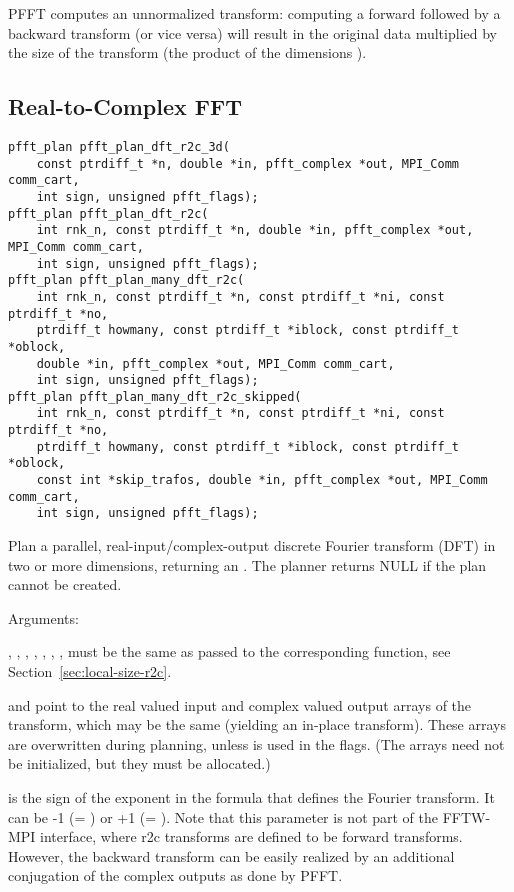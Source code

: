 PFFT computes an unnormalized transform: computing a forward followed by a backward transform (or vice versa) will result
in the original data multiplied by the size of the transform (the product of the dimensions ).

\subsection{Real-to-Complex FFT}
\begin{lstlisting}
pfft_plan pfft_plan_dft_r2c_3d(
    const ptrdiff_t *n, double *in, pfft_complex *out, MPI_Comm comm_cart,
    int sign, unsigned pfft_flags);
pfft_plan pfft_plan_dft_r2c(
    int rnk_n, const ptrdiff_t *n, double *in, pfft_complex *out, MPI_Comm comm_cart,
    int sign, unsigned pfft_flags);
pfft_plan pfft_plan_many_dft_r2c(
    int rnk_n, const ptrdiff_t *n, const ptrdiff_t *ni, const ptrdiff_t *no,
    ptrdiff_t howmany, const ptrdiff_t *iblock, const ptrdiff_t *oblock,
    double *in, pfft_complex *out, MPI_Comm comm_cart,
    int sign, unsigned pfft_flags);
pfft_plan pfft_plan_many_dft_r2c_skipped(
    int rnk_n, const ptrdiff_t *n, const ptrdiff_t *ni, const ptrdiff_t *no,
    ptrdiff_t howmany, const ptrdiff_t *iblock, const ptrdiff_t *oblock,
    const int *skip_trafos, double *in, pfft_complex *out, MPI_Comm comm_cart,
    int sign, unsigned pfft_flags);
\end{lstlisting}
Plan a parallel, real-input/complex-output discrete Fourier transform (DFT) in two or more dimensions, returning an .
The planner returns NULL if the plan cannot be created.

Arguments:
\begin{compactitem}
  \item {}, , , , , , ,  must be the same as passed
        to the corresponding  function, see Section~\ref{sec:local-size-r2c}.
  \item {} and  point to the real valued input and complex valued output arrays of the transform, which may be the same (yielding an in-place transform).
        These arrays are overwritten during planning, unless  is used in the flags.
        (The arrays need not be initialized, but they must be allocated.)
  \item {} is the sign of the exponent in the formula that defines the Fourier transform. It can be -1 (= ) or +1 (= ).
        Note that this parameter is not part of the FFTW-MPI interface, where r2c transforms are defined to be forward transforms.
        However, the backward transform can be easily realized by an additional conjugation of the complex outputs as done by PFFT.
\end{compactitem}

